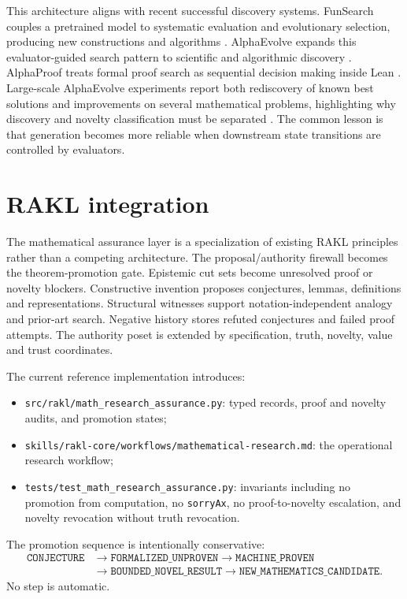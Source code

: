 \documentclass[11pt]{article}
\newcommand{\RAKL}{\textsc{RAKL}}
\begin{document}
This architecture aligns with recent successful discovery systems. FunSearch couples a pretrained model to systematic evaluation and evolutionary selection, producing new constructions and algorithms \cite{romera2024}. AlphaEvolve expands this evaluator-guided search pattern to scientific and algorithmic discovery \cite{novikov2025}. AlphaProof treats formal proof search as sequential decision making inside Lean \cite{hubert2025}. Large-scale AlphaEvolve experiments report both rediscovery of known best solutions and improvements on several mathematical problems, highlighting why discovery and novelty classification must be separated \cite{georgiev2025}. The common lesson is that generation becomes more reliable when downstream state transitions are controlled by evaluators.

\section{RAKL integration}

The mathematical assurance layer is a specialization of existing \RAKL{} principles rather than a competing architecture. The proposal/authority firewall becomes the theorem-promotion gate. Epistemic cut sets become unresolved proof or novelty blockers. Constructive invention proposes conjectures, lemmas, definitions and representations. Structural witnesses support notation-independent analogy and prior-art search. Negative history stores refuted conjectures and failed proof attempts. The authority poset is extended by specification, truth, novelty, value and trust coordinates.

The current reference implementation introduces:
\begin{itemize}[leftmargin=*]
\item \texttt{src/rakl/math\_research\_assurance.py}: typed records, proof and novelty audits, and promotion states;
\item \texttt{skills/rakl-core/workflows/mathematical-research.md}: the operational research workflow;
\item \texttt{tests/test\_math\_research\_assurance.py}: invariants including no promotion from computation, no \texttt{sorryAx}, no proof-to-novelty escalation, and novelty revocation without truth revocation.
\end{itemize}

The promotion sequence is intentionally conservative:
\[
\begin{aligned}
\texttt{CONJECTURE}
&\rightarrow \texttt{FORMALIZED\_UNPROVEN}
\rightarrow \texttt{MACHINE\_PROVEN}\\
&\rightarrow \texttt{BOUNDED\_NOVEL\_RESULT}
\rightarrow \texttt{NEW\_MATHEMATICS\_CANDIDATE}.
\end{aligned}
\]
No step is automatic.
\end{document}
